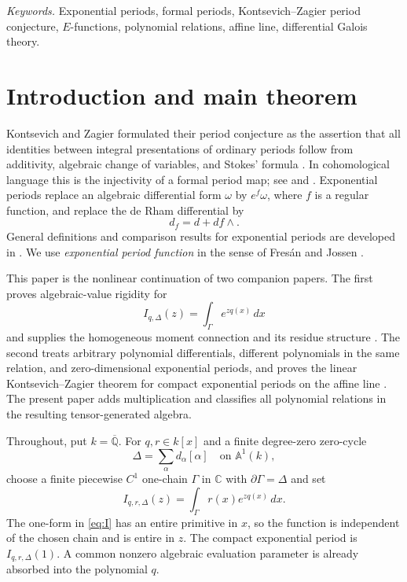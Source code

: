 \documentclass[11pt]{article}
\numberwithin{equation}{section}
\theoremstyle{definition}
\theoremstyle{remark}
\newcommand{\C}{\mathbb C}
\newcommand{\Qbar}{\overline{\mathbb Q}}
\newcommand{\Aone}{\mathbb A^1}
\begin{document}
\noindent\textit{Keywords.}
Exponential periods, formal periods, Kontsevich--Zagier period conjecture,
$E$-functions, polynomial relations, affine line, differential Galois theory.

\section{Introduction and main theorem}\label{sec:introduction}

Kontsevich and Zagier formulated their period conjecture as the assertion that
all identities between integral presentations of ordinary periods follow from
additivity, algebraic change of variables, and Stokes' formula
\cite{KontsevichZagier}.  In cohomological language this is the injectivity of
a formal period map; see \cite[Chapters~12--13]{HuberMullerStach} and
\cite{CressonViuSos}.  Exponential periods replace an algebraic differential
form $\omega$ by $e^f\omega$, where $f$ is a regular function, and replace the
de Rham differential by
\[
  d_f=d+df\wedge.
\]
General definitions and comparison results for exponential periods are
developed in \cite{CommelinHabeggerHuber,FresanJossenExp}.  We use \emph{exponential period
function} in the sense of Fres\'an and Jossen \cite{FresanJossen}.

This paper is the nonlinear continuation of two companion papers.  The first
proves algebraic-value rigidity for
\[
  I_{q,\Delta}(z)=\int_\Gamma e^{zq(x)}\,dx
\]
and supplies the homogeneous moment connection and its residue structure
\cite{LongEIT}.  The second treats arbitrary polynomial differentials,
different polynomials in the same relation, and zero-dimensional exponential
periods, and proves the linear Kontsevich--Zagier theorem for compact
exponential periods on the affine line \cite{LongLinearKZ}.  The present paper
adds multiplication and classifies all polynomial relations in the resulting
tensor-generated algebra.

Throughout, put $k=\Qbar$.  For $q,r\in k[x]$ and a finite degree-zero
zero-cycle
\[
  \Delta=\sum_{\alpha}d_\alpha[\alpha]
  \quad\text{on }\Aone(k),
\]
choose a finite piecewise $C^1$ one-chain $\Gamma$ in $\C$ with
$\partial\Gamma=\Delta$ and set
\begin{equation}\label{eq:I}
  I_{q,r,\Delta}(z)=\int_\Gamma r(x)e^{zq(x)}\,dx.
\end{equation}
The one-form in \eqref{eq:I} has an entire primitive in $x$, so the function
is independent of the chosen chain and is entire in $z$.  The compact
exponential period is $I_{q,r,\Delta}(1)$.  A common nonzero algebraic
evaluation parameter is already absorbed into the polynomial $q$.
\end{document}
